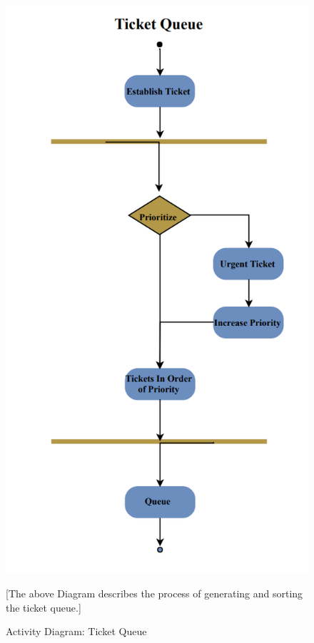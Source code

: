 \documentclass[letterpaper]{article}
\begin{document}
\begin{figure}[htbp]
  \includegraphics[]{AD_TicketQueue}
  \caption{Activity Diagram: Ticket Queue}[The above Diagram describes the process of generating and sorting the ticket queue.]
  \centering
\end{figure}
\end{document}
